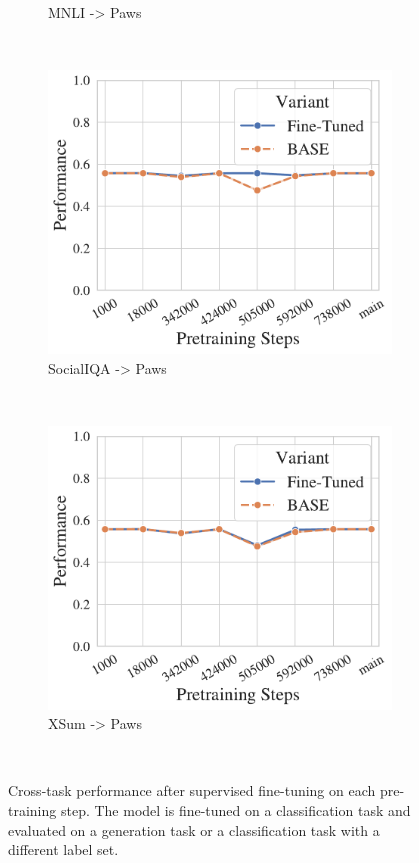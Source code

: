 \begin{figure}[t!]
\begin{subfigure}[b]{0.3\textwidth}
        \caption{MNLI -> Paws}
    \end{subfigure}%
    ~ 
    \begin{subfigure}[b]{0.3\textwidth}
    \includegraphics[width=\the\columnwidth]{figures/fig_files/cross-task/sft_evalpaws-trainsocialiqa.pdf}
        \caption{SocialIQA -> Paws}
    \end{subfigure}%
    ~ 
    \begin{subfigure}[b]{0.3\textwidth}
    \includegraphics[width=\the\columnwidth]{figures/fig_files/cross-task/sft_evalpaws-trainxsum.pdf}
        \caption{XSum -> Paws}
    \end{subfigure}%
    \\
    \caption{Cross-task performance after supervised fine-tuning on each pre-training step. The model is fine-tuned on a classification task and evaluated on a generation task or a classification task with a different label set.}
    \label{fig:cross-task-ckpt-perf-class}
\end{figure}

